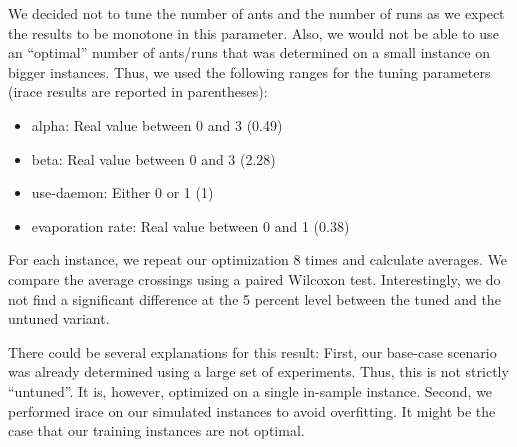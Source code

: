 \documentclass{scrartcl}
\begin{document}
We decided not to tune the number of ants and the number of runs as we
expect the results to be monotone in this parameter. Also, we would
not be able to use an ``optimal'' number of ants/runs that was
determined on a small instance on bigger instances. Thus, we used the
following ranges for the tuning parameters (irace results are reported in parentheses):

\begin{itemize}
  \item alpha: Real value between 0 and 3 (0.49)
  \item beta: Real value between 0 and 3 (2.28)
  \item use-daemon: Either 0 or 1 (1)
  \item evaporation rate: Real value between 0 and 1 (0.38)
\end{itemize}

For each instance, we repeat our optimization 8 times and calculate
averages. We compare the average crossings using a paired Wilcoxon
test. Interestingly, we do not find a significant difference at the 5
percent level between the tuned and the untuned variant.

There could be several explanations for this result: First, our
base-case scenario was already determined using a large set of
experiments. Thus, this is not strictly ``untuned''. It is, however,
optimized on a single in-sample instance. Second, we performed irace
on our simulated instances to avoid overfitting. It might be the case
that our training instances are not optimal.
\end{document}
